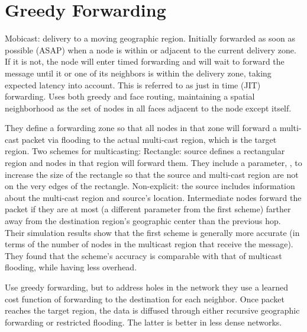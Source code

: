 \documentclass[conference]{IEEEtran}
\begin{document}

\section{Greedy Forwarding}

\cite{Huang2005} Mobicast: delivery to a moving geographic region.
Initially forwarded as soon as possible (ASAP) when a node is within or adjacent to the current delivery zone.
If it is not, the node will enter timed forwarding and will wait to forward the message until it or one of its neighbors is within the delivery zone, taking expected latency into account.
This is referred to as just in time (JIT) forwarding.
Uses both greedy and face routing, maintaining a spatial neighborhood as the set of nodes in all faces adjacent to the node except itself.


\cite{749282} They define a forwarding zone so that all nodes in that zone will forward a multi-cast packet via flooding to the actual multi-cast region, which is the target region.
Two schemes for multicasting:          
Rectangle: source defines a rectangular region and nodes in that region will forward them. 
They include a parameter, \delta, to increase the size of the rectangle so that the source and multi-cast region are not on the very edges of the rectangle.          
Non-explicit: the source includes information about the multi-cast region and source's location.  Intermediate nodes forward the packet if they are at most \delta (a different parameter from the first scheme) farther away from the destination region's geographic center than the previous hop.
Their simulation results show that the first scheme is generally more accurate (in terms of the number of nodes in the multicast region that receive the message).
They found that the scheme's accuracy is comparable with that of multicast flooding, while having less overhead.

\cite{Yu01geographicaland} Use greedy forwarding, but to address holes in the network they use a learned cost function of forwarding to the destination for each neighbor.  Once packet reaches the target region, the data is diffused through either recursive geographic forwarding or restricted flooding.  The latter is better in less dense networks.
\end{document}
